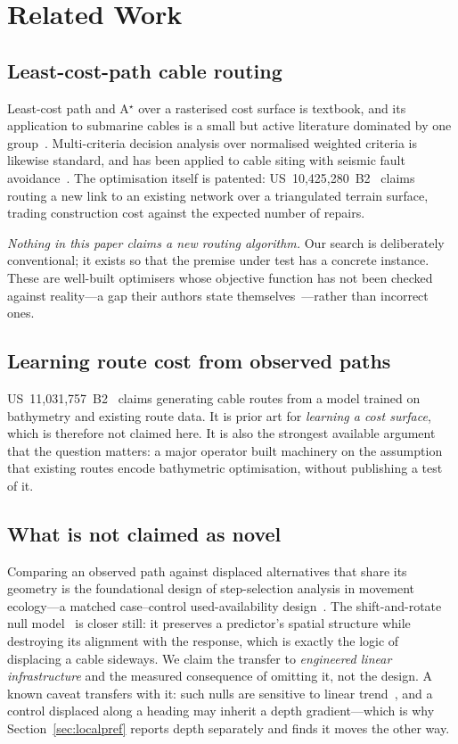 \documentclass[journal]{IEEEtran}
\begin{document}
\section{Related Work}\label{sec:rw}

\subsection{Least-cost-path cable routing}
Least-cost path and A$^\star$ over a rasterised cost surface is textbook, and
its application to submarine cables is a small but active literature dominated
by one group~\cite{wang2018fastmarching,wang2019cost,wang2020trunkbranch,
wang2023tonga,wang2024evaluating}. Multi-criteria decision analysis over
normalised weighted criteria is likewise standard, and has been applied to
cable siting with seismic fault avoidance~\cite{makrakis2023gis}. The
optimisation itself is patented: US~10,425,280~B2~\cite{cityu_patent_2019}
claims routing a new link to an existing network over a triangulated terrain
surface, trading construction cost against the expected number of repairs.

\emph{Nothing in this paper claims a new routing algorithm.} Our search is
deliberately conventional; it exists so that the premise under test has a
concrete instance. These are well-built optimisers whose objective function has
not been checked against reality---a gap their authors state
themselves~\cite{wang2024evaluating}---rather than incorrect ones.

\subsection{Learning route cost from observed paths}
US~11,031,757~B2~\cite{google_patent_2021} claims generating cable routes from
a model trained on bathymetry and existing route data. It is prior art for
\emph{learning a cost surface}, which is therefore not claimed here. It is also
the strongest available argument that the question matters: a major operator
built machinery on the assumption that existing routes encode bathymetric
optimisation, without publishing a test of it.

\subsection{What is not claimed as novel}
Comparing an observed path against displaced alternatives that share its
geometry is the foundational design of step-selection analysis in movement
ecology---a matched case--control used-availability
design~\cite{fortin2005wolves,thurfjell2014ssf,avgar2016issa}. The
shift-and-rotate null model~\cite{ridder2024shiftrotate} is closer still: it
preserves a predictor's spatial structure while destroying its alignment with
the response, which is exactly the logic of displacing a cable sideways. We
claim the transfer to \emph{engineered linear infrastructure} and the measured
consequence of omitting it, not the design. A known caveat transfers with it:
such nulls are sensitive to linear trend~\cite{wagner2015moran}, and a control
displaced along a heading may inherit a depth gradient---which is why
Section~\ref{sec:localpref} reports depth separately and finds it moves the
other way.
\end{document}
